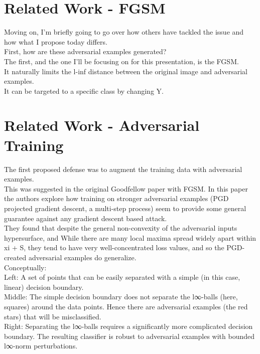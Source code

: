 \documentclass{article}
\begin{document}
\section{Related Work - FGSM }
Moving on, I'm briefly going to go over how others have tackled the issue and how what I propose today differs.\\
First, how are these adversarial examples generated?\\
The first, and the one I'll be focusing on for this presentation, is the FGSM.\\
It naturally limits the l-inf distance between the original image and adversarial examples.\\
It can be targeted to a specific class by changing Y.\\

\section{Related Work - Adversarial Training}
The first proposed defense was to augment the training data with adversarial examples.\\
This was suggested in the original Goodfellow paper with FGSM. In this paper the authors explore how training on stronger adversarial examples (PGD projected gradient descent, a multi-step process) seem to provide some general guarantee against any gradient descent based attack.\\
They found that despite the general non-convexity of the adversarial inputs hypersurface, and While there are many local maxima spread widely apart within xi + S, they tend to have very well-concentrated loss values, and so the PGD-created adversarial examples do generalize.\\
Conceptually: \\
Left: A set of points that can be easily separated with a simple (in this case, linear) decision boundary.\\
Middle: The simple decision boundary does not separate the l∞-balls (here, squares) around the data points. Hence there are adversarial examples (the red stars) that will be misclassified.\\
Right: Separating the  l∞-balls requires a significantly more complicated decision boundary. The resulting classifier is robust to adversarial examples with bounded l∞-norm perturbations.
\end{document}
